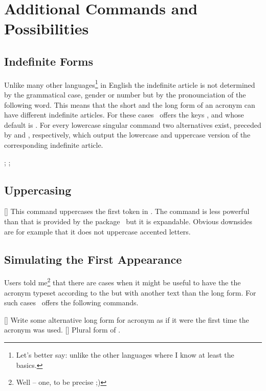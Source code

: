 \documentclass[load-preamble+,scrartcl={DIV10}]{cnltx-doc}
\begin{document}
\section{Additional Commands and Possibilities}
\subsection{Indefinite Forms}
\noindent{}%
Unlike many other languages\footnote{Let's better say: unlike the other
  languages where I know at least the basics.} in English the indefinite
article is not determined by the grammatical case, gender or number but by the
pronounciation of the following word.  This means that the short and the long
form of an acronym can have different indefinite articles.  For these cases
\acro\ offers the keys ,  and
 whose default is .  For every lowercase
singular command two alternatives exist, preceded by  and ,
respectively, which output the lowercase and uppercase version of the
corresponding indefinite article.

\begin{example}
  ; ; 
\end{example}

\subsection{Uppercasing}
\begin{commands}
  []
     This command uppercases the first token in .  The command is less powerful than  that is
     provided by the  package~\cite{pkg:mfirstuc} but it is
     expandable.  Obvious downsides are for example that it does not uppercase
     accented letters.
\end{commands}

\subsection{Simulating the First Appearance}
\noindent{}%
Users told me\footnote{Well -- one, to be precise ;)} that there are cases
when it might be useful to have the the acronym typeset according to the
 but with another text than the long form.  For such cases
\acro\ offers the following commands.
\begin{commands}
  [\sarg{}]
    Write some alternative long form for acronym  as if it were the
    first time the acronym was used.
  [\sarg{}]
    Plural form of .
\end{commands}
\end{document}
